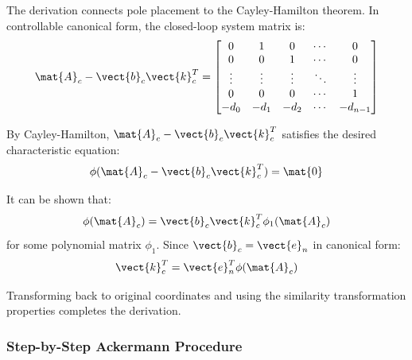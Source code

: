 The derivation connects pole placement to the Cayley-Hamilton theorem. In controllable canonical form, the closed-loop system matrix is:
\begin{equation}
\mat{A}_c - \vect{b}_c\vect{k}_c^T = \begin{bmatrix}
0 & 1 & 0 & \cdots & 0 \\
0 & 0 & 1 & \cdots & 0 \\
\vdots & \vdots & \vdots & \ddots & \vdots \\
0 & 0 & 0 & \cdots & 1 \\
-d_0 & -d_1 & -d_2 & \cdots & -d_{n-1}
\end{bmatrix}
\end{equation}

By Cayley-Hamilton, $\mat{A}_c - \vect{b}_c\vect{k}_c^T$ satisfies the desired characteristic equation:
\begin{equation}
\phi(\mat{A}_c - \vect{b}_c\vect{k}_c^T) = \mat{0}
\end{equation}

It can be shown that:
\begin{equation}
\phi(\mat{A}_c) = \vect{b}_c\vect{k}_c^T\phi_1(\mat{A}_c)
\end{equation}
for some polynomial matrix $\phi_1$. Since $\vect{b}_c = \vect{e}_n$ in canonical form:
\begin{equation}
\vect{k}_c^T = \vect{e}_n^T\phi(\mat{A}_c)
\end{equation}

Transforming back to original coordinates and using the similarity transformation properties completes the derivation.

\subsubsection{Step-by-Step Ackermann Procedure}

